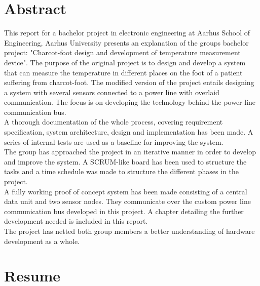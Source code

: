 \chapter{Abstract}
This report for a bachelor project in electronic engineering at Aarhus School of Engineering, Aarhus University presents an explanation of the groups bachelor project: "Charcot-foot design and development of temperature measurement device". The purpose of the original project is to design and develop a system that can measure the temperature in different places on the foot of a patient suffering from charcot-foot. The modified version of the project entails designing a system with several sensors connected to a power line with overlaid communication. The focus is on developing the technology behind the power line communication bus.\\
A thorough documentation of the whole process, covering requirement specification, system architecture, design and implementation has been made. A series of internal tests are used as a baseline for improving the system.\\
The group has approached the project in an iterative manner in order to develop and improve the system. A SCRUM-like board has been used to structure the tasks and a time schedule was made to structure the different phases in the project.\\
A fully working proof of concept system has been made consisting of a central data unit and two sensor nodes. They communicate over the custom power line communication bus developed in this project. A chapter detailing the further development needed is included in this report.\\
The project has netted both group members a better understanding of hardware development as a whole.\\

\chapter{Resume}
